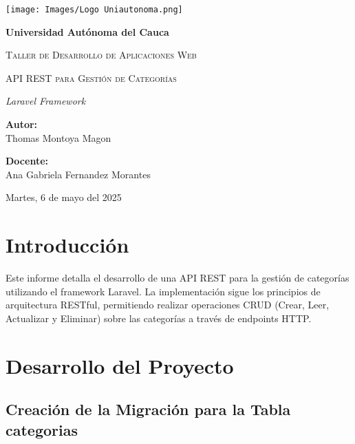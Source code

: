 \documentclass{article}
\begin{document}
\begin{titlepage}
\centering
\texttt{[image: Images/Logo Uniautonoma.png]}\par
\vspace{1cm}
{\bfseries\LARGE Universidad Autónoma del Cauca\par}
\vspace{0.5cm}
{\scshape\Large Taller de Desarrollo de Aplicaciones Web\par}
\vspace{0.5cm}
{\scshape\Huge API REST para Gestión de Categorías\par}
\vspace{1cm}
{\itshape\LARGE Laravel Framework\par}
\vspace{1.5cm}
{\Large \textbf{Autor:} \\ Thomas Montoya Magon\par}
\vspace{0.5cm}
{\Large \textbf{Docente:} \\ Ana Gabriela Fernandez Morantes\par}
\vfill
{\Large Martes, 6 de mayo del 2025\par}
\end{titlepage}

\clearpage
\pagestyle{plain}
\tableofcontents
\clearpage
\pagestyle{fancy}

\section{Introducción}

Este informe detalla el desarrollo de una API REST para la gestión de categorías utilizando el framework Laravel. La implementación sigue los principios de arquitectura RESTful, permitiendo realizar operaciones CRUD (Crear, Leer, Actualizar y Eliminar) sobre las categorías a través de endpoints HTTP.

\section{Desarrollo del Proyecto}

\subsection{Creación de la Migración para la Tabla categorias}
\end{document}

